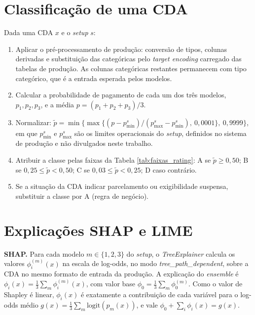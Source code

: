 \begin{apendicesenv}
\section{Classificação de uma CDA}
\label{ap:alg_rating}

Dada uma CDA $x$ e o \textit{setup} $s$:

\begin{enumerate}
    \item Aplicar o pré-processamento de produção: conversão de tipos, colunas derivadas e substituição das categóricas pelo \textit{target encoding} carregado das tabelas de produção. As colunas categóricas restantes permanecem com tipo categórico, que é a entrada esperada pelos modelos.
    \item Calcular a probabilidade de pagamento de cada um dos três modelos, $p_1, p_2, p_3$, e a média $p = (p_1 + p_2 + p_3)/3$.
    \item Normalizar: $\tilde{p} = \min\{\max\{(p - p_{\min}^{s})/(p_{\max}^{s} - p_{\min}^{s}),\ 0{,}0001\},\ 0{,}9999\}$, em que $p_{\min}^{s}$ e $p_{\max}^{s}$ são os limites operacionais do \textit{setup}, definidos no sistema de produção e não divulgados neste trabalho.
    \item Atribuir a classe pelas faixas da Tabela \ref{tab:faixas_rating}: A se $\tilde{p} \ge 0{,}50$; B se $0{,}25 \le \tilde{p} < 0{,}50$; C se $0{,}03 \le \tilde{p} < 0{,}25$; D caso contrário.
    \item Se a situação da CDA indicar parcelamento ou exigibilidade suspensa, substituir a classe por A (regra de negócio).
\end{enumerate}

\section{Explicações SHAP e LIME}
\label{ap:alg_explicacoes}

\textbf{SHAP.} Para cada modelo $m \in \{1, 2, 3\}$ do \textit{setup}, o \textit{TreeExplainer} calcula os valores $\phi_i^{(m)}(x)$ na escala de log-odds, no modo \textit{tree\_path\_dependent}, sobre a CDA no mesmo formato de entrada da produção. A explicação do \textit{ensemble} é $\phi_i(x) = \frac{1}{3}\sum_m \phi_i^{(m)}(x)$, com valor base $\phi_0 = \frac{1}{3}\sum_m \phi_0^{(m)}$. Como o valor de Shapley é linear, $\phi_i(x)$ é exatamente a contribuição de cada variável para o log-odds médio $g(x) = \frac{1}{3}\sum_m \mathrm{logit}(p_m(x))$, e vale $\phi_0 + \sum_i \phi_i(x) = g(x)$.


\end{apendicesenv}
